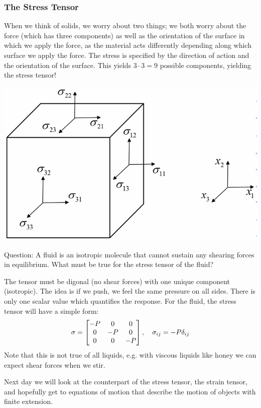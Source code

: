 \subsubsection{The Stress Tensor}
When we think of solids, we worry about two things; we both worry about the force (which has three components) as well as the orientation of the surface in which we apply the force, as the material acts differently depending along which surface we apply the force. The stress is specified by the direction of action and the orientation of the surface. This yields $3 \cdot 3 = 9$ possible components, yielding the stress tensor!
\begin{center}
    \includegraphics[scale=0.5]{Lecture-30/l30-img7.png}
\end{center}
Question: A fluid is an isotropic molecule that cannot sustain any shearing forces in equilibrium. What must be true for the stress tensor of the fluid?
\begin{s}
    The tensor must be digonal (no shear forces) with one unique component (isotropic). The idea is if we push, we feel the same pressure on all sides. There is only one scalar value which quantifies the response. For the fluid, the stress tensor will have a simple form:
    \[\sigma = \begin{bmatrix}-P & 0 & 0 \\ 0 & -P & 0 \\ 0 & 0 & -P\end{bmatrix}, \quad  \sigma_{ij} = -P\delta_{ij}\]
    Note that this is not true of all liquids, e.g. with viscous liquids like honey we can expect shear forces when we stir.
\end{s}
Next day we will look at the counterpart of the stress tensor, the strain tensor, and hopefully get to equations of motion that describe the motion of objects with finite extension. 